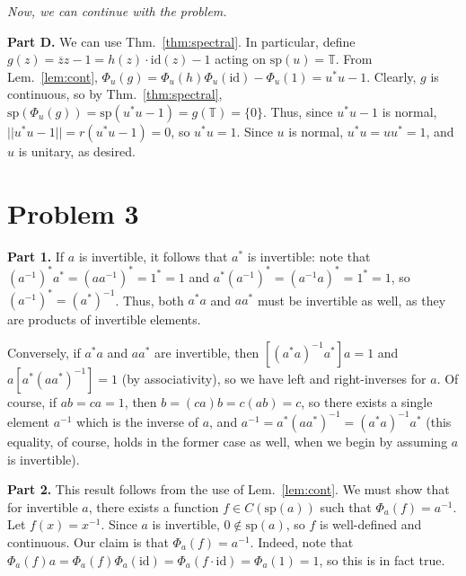 \documentclass[aps,pra,showpacs,notitlepage,onecolumn,superscriptaddress,nofootinbib]{revtex4-1}
\newcommand{\hhrulefill}{\hspace{-1.0em}\hrulefill}
\theoremstyle{definition}
\begin{document}
  \noindent \emph{Now, we can continue with the problem.}
  \newline

  \noindent \textbf{Part D.} We can use Thm.~\ref{thm:spectral}. In particular, define $g(z) = \overline{z} z - 1 = h(z) \cdot \text{id}(z) - 1$ acting on $\text{sp}(u) = \mathbb{T}$. From Lem.~\ref{lem:cont}, $\Phi_u(g) = \Phi_u(h) \Phi_u(\text{id}) - \Phi_u(1) = u^{*} u - 1$.
  Clearly, $g$ is continuous, so by Thm.~\ref{thm:spectral}, $\text{sp}(\Phi_{u}(g)) = \text{sp}(u^{*} u - 1) = g(\mathbb{T}) = \{0\}$. Thus, since $u^{*} u - 1$ is normal, $||u^{*} u - 1|| = r(u^{*} u - 1) = 0$, so $u^{*} u = 1$. Since $u$ is normal, $u^{*} u = u u^{*} = 1$,
  and $u$ is unitary, as desired.

\hhrulefill

\section{Problem 3}

\noindent \textbf{Part 1.} If $a$ is invertible, it follows that $a^{*}$ is invertible: note that $(a^{-1})^{*} a^{*} = (a a^{-1})^{*} = 1^{*} = 1$ and $a^{*} (a^{-1})^{*} = (a^{-1} a)^{*} = 1^{*} = 1$, so $(a^{-1})^{*} = (a^{*})^{-1}$. Thus,
both $a^{*} a$ and $a a^{*}$ must be invertible as well, as they are products of invertible elements.

Conversely, if $a^{*} a$ and $a a^{*}$ are invertible, then $[(a^{*} a)^{-1} a^{*} ] a = 1$ and $a [a^{*} (a a^{*})^{-1}] = 1$ (by associativity), so we have left and right-inverses for $a$. Of course, if $ab = ca = 1$, then $b = (ca)b = c(ab) = c$,
so there exists a single element $a^{-1}$ which is the inverse of $a$, and $a^{-1} = a^{*} (a a^{*})^{-1} = (a^{*} a)^{-1} a^{*}$ (this equality, of course, holds in the former case as well, when we begin by assuming $a$ is invertible).
\newline

\noindent \textbf{Part 2.} This result follows from the use of Lem.~\ref{lem:cont}. We must show that for invertible $a$, there exists a function $f \in C(\text{sp}(a))$ such that $\Phi_a(f) = a^{-1}$. Let $f(x) = x^{-1}$. Since $a$ is invertible, $0 \notin \text{sp}(a)$, so
$f$ is well-defined and continuous. Our claim is that $\Phi_a(f) = a^{-1}$. Indeed, note that $\Phi_a(f) a = \Phi_a(f) \Phi_a(\text{id}) = \Phi_a(f \cdot \text{id}) = \Phi_a(1) = 1$, so this is in fact true.
\newline
\end{document}
